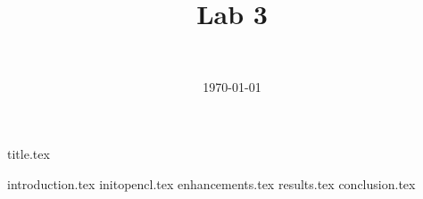 \documentclass[final]{report} %
\title{Lab 3}
\author{~}
\date{\today}
\begin{document}

{title.tex}
\newpage
\tableofcontents

\newpage
{}
{introduction.tex}
{initopencl.tex}
{enhancements.tex}
{results.tex}
{conclusion.tex}
\newpage
{}

\printbibliography
\end{document}

